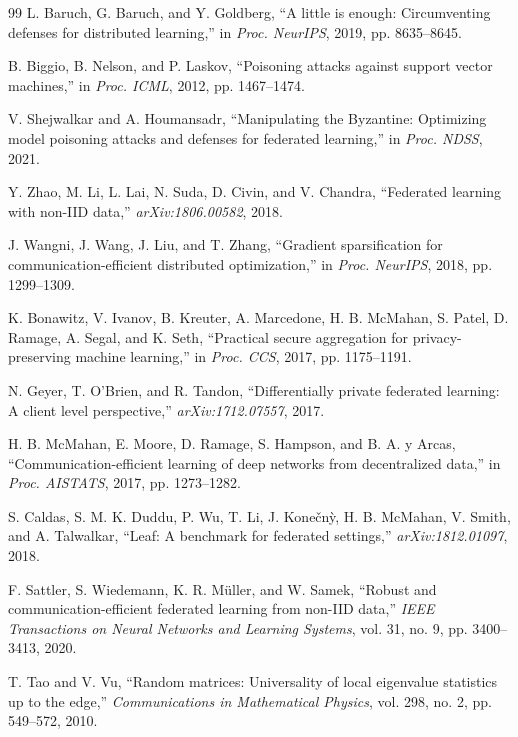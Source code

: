 \documentclass[runningheads]{llncs}
\begin{document}
\begin{thebibliography}{99}
 L. Baruch, G. Baruch, and Y. Goldberg, ``A little is enough: Circumventing defenses for distributed learning,'' in \textit{Proc. NeurIPS}, 2019, pp. 8635--8645.

 B. Biggio, B. Nelson, and P. Laskov, ``Poisoning attacks against support vector machines,'' in \textit{Proc. ICML}, 2012, pp. 1467--1474.

 V. Shejwalkar and A. Houmansadr, ``Manipulating the Byzantine: Optimizing model poisoning attacks and defenses for federated learning,'' in \textit{Proc. NDSS}, 2021.

 Y. Zhao, M. Li, L. Lai, N. Suda, D. Civin, and V. Chandra, ``Federated learning with non-IID data,'' \textit{arXiv:1806.00582}, 2018.

 J. Wangni, J. Wang, J. Liu, and T. Zhang, ``Gradient sparsification for communication-efficient distributed optimization,'' in \textit{Proc. NeurIPS}, 2018, pp. 1299--1309.

 K. Bonawitz, V. Ivanov, B. Kreuter, A. Marcedone, H. B. McMahan, S. Patel, D. Ramage, A. Segal, and K. Seth, ``Practical secure aggregation for privacy-preserving machine learning,'' in \textit{Proc. CCS}, 2017, pp. 1175--1191.

 N. Geyer, T. O'Brien, and R. Tandon, ``Differentially private federated learning: A client level perspective,'' \textit{arXiv:1712.07557}, 2017.

 H. B. McMahan, E. Moore, D. Ramage, S. Hampson, and B. A. y Arcas, ``Communication-efficient learning of deep networks from decentralized data,'' in \textit{Proc. AISTATS}, 2017, pp. 1273--1282.

 S. Caldas, S. M. K. Duddu, P. Wu, T. Li, J. Konečnỳ, H. B. McMahan, V. Smith, and A. Talwalkar, ``Leaf: A benchmark for federated settings,'' \textit{arXiv:1812.01097}, 2018.

 F. Sattler, S. Wiedemann, K. R. Müller, and W. Samek, ``Robust and communication-efficient federated learning from non-IID data,'' \textit{IEEE Transactions on Neural Networks and Learning Systems}, vol. 31, no. 9, pp. 3400--3413, 2020.

 T. Tao and V. Vu, ``Random matrices: Universality of local eigenvalue statistics up to the edge,'' \textit{Communications in Mathematical Physics}, vol. 298, no. 2, pp. 549--572, 2010.


\end{thebibliography}
\end{document}
